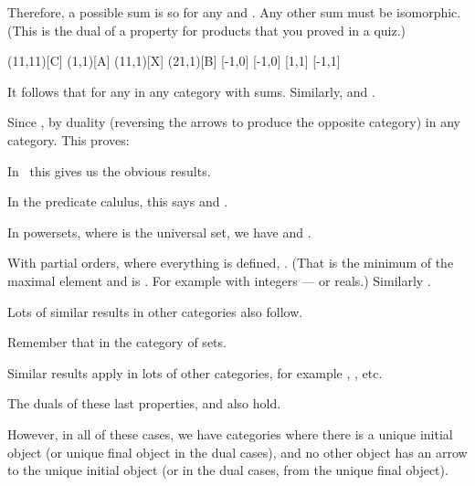 \documentclass{seminar}
\begin{document}
\begin{slide}
Therefore, a possible sum is  so  for any
 and .
Any other sum must be isomorphic.  (This is the dual of a property
for products that you
proved in a quiz.)

\newslide

\begin{cdiag}
\obj(11,11)[C]{}
\obj(1,1)[A]{}
\obj(11,1)[X]{}
\obj(21,1)[B]{}
[-1,0]
[-1,0]
[1,1]
[-1,1]
\end{cdiag}

It follows that  for any  in any category
with sums.  Similarly,  and .

\newslide

Since , by duality (reversing the arrows to produce the
opposite category)  in any category.  This proves:

In  \, this gives us the obvious results.

In the predicate calulus, this says  and
.

In powersets, where  is the universal set, we have
 and .

With partial orders, where everything is defined,
.  (That is the minimum of the maximal element and
 is .  For
example  with integers --- or reals.)
Similarly .

Lots of similar results in other categories also follow.

\newpage

Remember that  in the category of sets.

Similar results apply in lots of other categories, for example
, , etc.

The duals of these last properties,  and
 also hold.

However, in all of these cases, we have categories
where there is a unique initial object (or unique final object in the dual
cases), and
no other object has an arrow to the unique initial object (or in the dual
cases, from the unique final object).


\end{slide}
\end{document}
